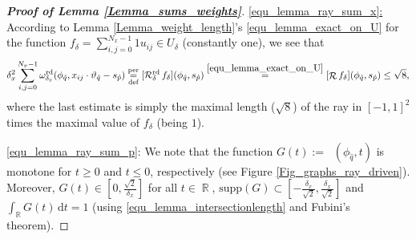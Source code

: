 \documentclass[11pt,reqno]{amsart}
\newcommand{\supp}[1]{\mathrm{supp}\left( #1 \right)}
\DeclareMathOperator{\RR}{\mathbb{R}}
\newcommand{\sumx}{\sum_{i,j=0}^{N_x-1}}
\DeclareMathOperator{\Radon}{\mathcal{R}}
\DeclareMathOperator{\RayRadon}{\mathcal{R}^\mathrm{rd}_{\delta}}
\DeclareMathOperator{\RayWeight}{\omega^\mathrm{rd}_{\delta_\mathit{x}}}
\newcommand{\dd}[1]{\,\mathrm{d}{#1}}
\numberwithin{theorem}{section}
\theoremstyle{remark}
\begin{document}
\begin{proof}[\textbf{Proof of Lemma \ref{Lemma_sums_weights}}]
\underline{\eqref{equ_lemma_ray_sum_x}:}   According to Lemma \ref{Lemma_weight_length}'s \eqref{equ_lemma_exact_on_U} for the function $f_\delta=\sumx 1 u_{ij}\in U_\delta$ (constantly one), we see that 
   \begin{equation}
    \delta_x^2\sumx  \RayWeight(\phi_{\hat q}, x_{ij}\cdot \vartheta_{\hat q}-s_{\hat p}) \underset{\text{def}}{\overset{\text{per}}{=}} [\RayRadon f_\delta](\phi_{\hat q},s_{ \hat p}) \overset{\eqref{equ_lemma_exact_on_U}}{=} [\Radon f_\delta](\phi_{\hat q},s_{ \hat p})  \leq \sqrt{8}, \notag
    \end{equation}
    where the last estimate is simply the maximal length ($\sqrt{8}$) of the ray in $[-1,1]^2$ times the maximal value of $f_\delta$ (being $1$). 

\underline{\eqref{equ_lemma_ray_sum_p}}: 
We note that the function $G(t) := \RayWeight(\phi_{\hat q},t)$ is monotone for $t\geq 0$ and $t\leq 0$, respectively (see Figure \ref{Fig_graphs_ray_driven}). Moreover, $G(t)\in [0,\frac{\sqrt{2}}{\delta_x}]$ for all $t\in \RR$, $\supp{G}\subset [-\frac{\delta_x}{\sqrt{2}},\frac{\delta_x}{\sqrt{2}}]$ and $\int_{\RR} G(t) \dd t = 1$ (using \eqref{equ_lemma_intersectionlength} and Fubini's theorem).
%
%
%


\end{proof}
\end{document}
